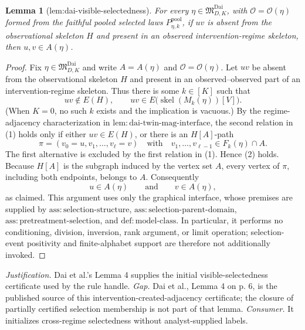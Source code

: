 \documentclass{article}
\newtheorem{lemma}{Lemma}
\begin{document}
\begin{lemma}[lem:dai-visible-selectedness]\label{lem:dai-visible-selectedness}
For every \(\eta\in\mathfrak M_{D,K}^{\mathrm{Dai}}\), with \(\mathcal O=\mathcal O(\eta)\) formed from the faithful pooled selected laws \(P_{\eta,k}^{\mathrm{pool}}\), if \(uv\) is absent from the observational skeleton \(H\) and present in an observed intervention-regime skeleton, then \(u,v\in A(\eta)\).
\end{lemma}
\begin{proof}
Fix \(\eta\in\mathfrak M_{D,K}^{\mathrm{Dai}}\) and write \(A=A(\eta)\) and \(\mathcal O=\mathcal O(\eta)\).  Let \(uv\) be absent from the observational skeleton \(H\) and present in an observed--observed part of an intervention-regime skeleton.  Thus there is some \(k\in[K]\) such that
\[
uv\notin E(H),
\qquad
uv\in E\bigl(\operatorname{skel}(M_k(\eta))[V]\bigr).
\tag{1}
\]
(When \(K=0\), no such \(k\) exists and the implication is vacuous.)  By the regime-adjacency characterization in \(\mathrm{lem:dai\mbox{-}twin\mbox{-}mag\mbox{-}interface}\), the second relation in (1) holds only if either \(uv\in E(H)\), or there is an \(H[A]\)-path
\[
\pi=(v_0=u,v_1,\ldots,v_\ell=v)
\quad\text{with}\quad
v_1,\ldots,v_{\ell-1}\in F_k(\eta)\cap A.
\tag{2}
\]
The first alternative is excluded by the first relation in (1).  Hence (2) holds.  Because \(H[A]\) is the subgraph induced by the vertex set \(A\), every vertex of \(\pi\), including both endpoints, belongs to \(A\).  Consequently
\[
u\in A(\eta)
\qquad\text{and}\qquad
v\in A(\eta),
\]
as claimed.  This argument uses only the graphical interface, whose premises are supplied by \(\mathrm{ass:selection\mbox{-}structure}\), \(\mathrm{ass:selection\mbox{-}parent\mbox{-}domain}\), \(\mathrm{ass:pretreatment\mbox{-}selection}\), and \(\mathrm{def:model\mbox{-}class}\).  In particular, it performs no conditioning, division, inversion, rank argument, or limit operation; selection-event positivity and finite-alphabet support are therefore not additionally invoked.
\end{proof}
\par\smallskip\noindent \textit{Justification.} Dai et al.'s Lemma 4 supplies the initial visible-selectedness certificate used by the rule handle. \textit{Gap.} Dai et al., Lemma 4 on p. 6, is the published source of this intervention-created-adjacency certificate; the closure of partially certified selection membership is not part of that lemma. \textit{Consumer.} It initializes cross-regime selectedness without analyst-supplied labels.
\end{document}
